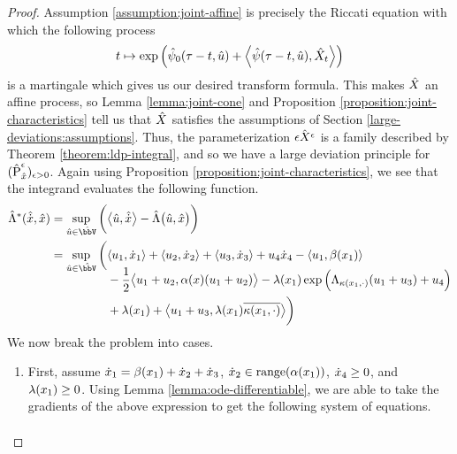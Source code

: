 \begin{proof}
  Assumption \ref{assumption:joint-affine} is precisely the Riccati equation with which the following process
  \[
    t \mapsto \exp\Big( \hat{\psi}_0(\tau-t, \hat{u}) + {\Big\langle \hat{\psi}(\tau-t, \hat{u}) , \hat{X}_t \Big\rangle} \Big)
  \]
  is a martingale which gives us our desired transform formula.
  This makes $\hat{X}$ an affine process, so Lemma \ref{lemma:joint-cone} and Proposition \ref{proposition:joint-characteristics} tell us that $\hat{X}$ satisfies the assumptions of Section \ref{large-deviations:assumptions}.
  Thus, the parameterization $\hat{\epsilon X^\epsilon}$ is a family described by Theorem \ref{theorem:ldp-integral}, and so we have a large deviation principle for $(\hat{{\operatorname{P}}}^\epsilon_{\hat{x}})_{\epsilon>0}$.
  Again using Proposition \ref{proposition:joint-characteristics}, we see that the integrand evaluates the following function.
  \begin{align*}
    \hat\ode^*(\hat{\diffVar}, \hat\stateVar) 
    &= \sup_{\hat\momentVar \in \hat\vecSpace} \bigg( \bprj{\hat\momentVar}{\hat\diffVar} - \hat\ode\big(\hat\momentVar, \hat\stateVar\big) \bigg) \\
    &= \sup_{\hat\momentVar \in \hat\vecSpace} \bigg(\begin{aligned}[t]
      &\prj{\momentVar_1}{\diffVar_1} 
      + \prj{\momentVar_2}{\diffVar_2} 
      + \prj{\momentVar_3}{\diffVar_3} 
      + \momentVar_4\diffVar_4
      - \prj{\momentVar_1}{\affDrift(\stateVar_1)}  \\
      &- \frac12\bprj{\momentVar_1+\momentVar_2}{\affDiff(\stateVar)(\momentVar_1+\momentVar_2)} 
      - \affInt(\stateVar_1)\exp\Big(\ode_{\affDist(\stateVar_1,\cdot)}(\momentVar_1+\momentVar_3) + \momentVar_4\Big) \\
      &+ \affInt(\stateVar_1) 
      + \bprj{\momentVar_1+\momentVar_3}{\affInt(\stateVar_1)\overline{\affDist(\stateVar_1,\cdot)}}  \bigg)
    \end{aligned}
  \end{align*}
  We now break the problem into cases.
  \begin{enumerate}
    \item
      First, assume $\dot{x}_1 = \beta(x_1) + \dot{x}_2 + \dot{x}_3$, $\dot{x}_2 \in \operatorname{range}(\alpha(x_1))$, $\dot{x}_4 \geq 0$, and $\lambda(x_1) \geq 0$.
      Using Lemma \ref{lemma:ode-differentiable}, we are able to take the gradients of the above expression to get the following system of equations.
      \begin{align*}

\end{align*}
\end{enumerate}
\end{proof}
